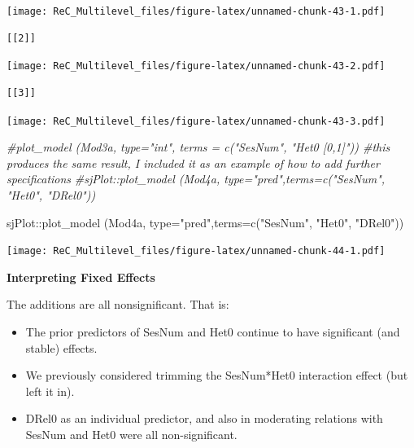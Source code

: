 \documentclass[
  11pt,
]{book}
\newenvironment{Shaded}{\begin{snugshade}}{\end{snugshade}}
\newcommand{\AttributeTok}[1]{\textcolor[rgb]{0.77,0.63,0.00}{#1}}
\newcommand{\CommentTok}[1]{\textcolor[rgb]{0.56,0.35,0.01}{\textit{#1}}}
\newcommand{\FunctionTok}[1]{\textcolor[rgb]{0.00,0.00,0.00}{#1}}
\newcommand{\NormalTok}[1]{#1}
\newcommand{\SpecialCharTok}[1]{\textcolor[rgb]{0.00,0.00,0.00}{#1}}
\newcommand{\StringTok}[1]{\textcolor[rgb]{0.31,0.60,0.02}{#1}}
\providecommand{\tightlist}{%
  \setlength{\itemsep}{0pt}\setlength{\parskip}{0pt}}
\begin{document}
\texttt{[image: ReC\_Multilevel\_files/figure-latex/unnamed-chunk-43-1.pdf]}

\begin{verbatim}
[[2]]
\end{verbatim}

\texttt{[image: ReC\_Multilevel\_files/figure-latex/unnamed-chunk-43-2.pdf]}

\begin{verbatim}
[[3]]
\end{verbatim}

\texttt{[image: ReC\_Multilevel\_files/figure-latex/unnamed-chunk-43-3.pdf]}

\begin{Shaded}
\begin{Highlighting}[]
\CommentTok{\#plot\_model (Mod3a, type="int", terms = c("SesNum", "Het0 [0,1]")) \#this produces the same result, I included it as an example of how to add further specifications}
\CommentTok{\#sjPlot::plot\_model (Mod4a, type="pred",terms=c("SesNum", "Het0", "DRel0"))}
\end{Highlighting}
\end{Shaded}

\begin{Shaded}
\begin{Highlighting}[]
\NormalTok{sjPlot}\SpecialCharTok{::}\FunctionTok{plot\_model}\NormalTok{ (Mod4a, }\AttributeTok{type=}\StringTok{"pred"}\NormalTok{,}\AttributeTok{terms=}\FunctionTok{c}\NormalTok{(}\StringTok{"SesNum"}\NormalTok{, }\StringTok{"Het0"}\NormalTok{, }\StringTok{"DRel0"}\NormalTok{))}
\end{Highlighting}
\end{Shaded}

\texttt{[image: ReC\_Multilevel\_files/figure-latex/unnamed-chunk-44-1.pdf]}

\textbf{Interpreting Fixed Effects}

The additions are all nonsignificant. That is:

\begin{itemize}
\tightlist
\item
  The prior predictors of SesNum and Het0 continue to have significant (and stable) effects.
\item
  We previously considered trimming the SesNum*Het0 interaction effect (but left it in).
\item
  DRel0 as an individual predictor, and also in moderating relations with SesNum and Het0 were all non-significant.
\end{itemize}
\end{document}
